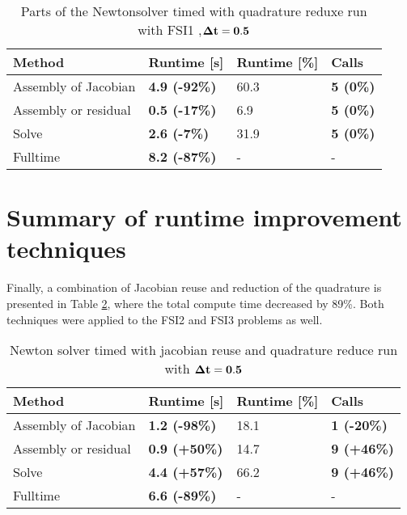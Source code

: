 \begin{table}[H]
\centering
\caption{Parts of the Newtonsolver timed with quadrature reduxe run with FSI1 ,$\bold{\Delta t = 0.5}$}
\label{tab:quadreduce}
\begin{tabular}{|l|l|l|l|}
\hline
Method & \textbf{Runtime {[}s{]}} & Runtime {[}\%{]} & \textbf{Calls} \\ \hline
Assembly of Jacobian & \textbf{4.9 (-92\%)} & 60.3 & \textbf{5 (0\%)} \\ \hline
Assembly or residual & \textbf{0.5 (-17\%)} & 6.9 & \textbf{5 (0\%)} \\ \hline
Solve & \textbf{2.6 (-7\%)} & 31.9 & \textbf{5 (0\%)} \\ \hline
Fulltime & \textbf{8.2 (-87\%)} & - & - \\ \hline
\end{tabular}
\end{table}


\section{Summary of runtime improvement techniques}
Finally, a combination of Jacobian reuse and reduction of the quadrature is presented in Table \ref{both_tech}, where the total compute time decreased by 89\%. Both techniques were applied to the FSI2 and FSI3 problems as well.

\begin{table}[H]
\centering
\caption{Newton solver timed with jacobian reuse and quadrature reduce run with $\bold{\Delta t = 0.5}$}
\label{both_tech}
\begin{tabular}{|l|l|l|l|}
\hline
Method & \textbf{Runtime {[}s{]}} & Runtime {[}\%{]} & \textbf{Calls} \\ \hline
Assembly of Jacobian & \textbf{1.2 (-98\%)} & 18.1 & \textbf{1 (-20\%)} \\ \hline
Assembly or residual & \textbf{0.9 (+50\%)} & 14.7 & \textbf{9 (+46\%)} \\ \hline
Solve & \textbf{4.4 (+57\%)} & 66.2 & \textbf{9 (+46\%)} \\ \hline
Fulltime & \textbf{6.6 (-89\%)} & - & - \\ \hline
\end{tabular}
\end{table}
















